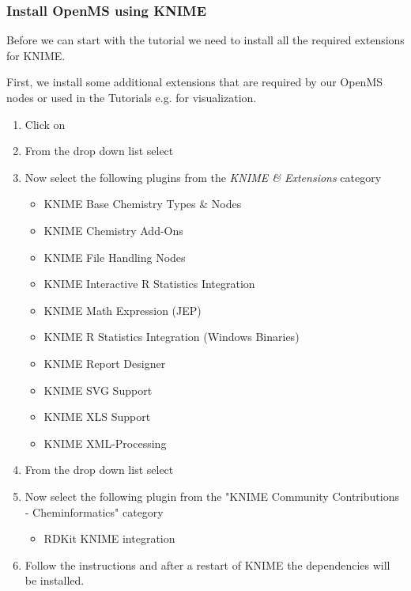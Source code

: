 % 
%

\subsubsection{Install OpenMS using KNIME}

Before we can start with the tutorial we need to install all the required extensions for KNIME.

First, we install some additional extensions that are required by our OpenMS nodes or used in the Tutorials e.g. for visualization.
\begin{enumerate}
\item Click on 
\item From the  drop down list select 
\item Now select the following plugins from the \textit{KNIME \& Extensions} category
    \begin{itemize}
    \item KNIME Base Chemistry Types \& Nodes
    \item KNIME Chemistry Add-Ons
    \item KNIME File Handling Nodes
    \item KNIME Interactive R Statistics Integration
    \item KNIME Math Expression (JEP)
    \item KNIME R Statistics Integration (Windows Binaries)
    \item KNIME Report Designer
    \item KNIME SVG Support
    \item KNIME XLS Support
    \item KNIME XML-Processing
    \end{itemize}
\item From the  drop down list select \\
\item Now select the following plugin from the "KNIME Community Contributions - Cheminformatics" category 	
    \begin{itemize}
    \item     RDKit KNIME integration
    \end{itemize}	
\item Follow the instructions and after a restart of KNIME the dependencies will be installed.
\end{enumerate}

